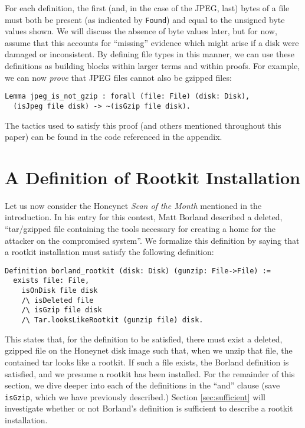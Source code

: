 \documentclass[nocopyrightspace,preprint]{sigplanconf}
\begin{document}
For each definition, the first (and, in the case of the JPEG, last) bytes of a
file must both be present (as indicated by {\tt Found}) and equal to the
unsigned byte values shown. We will discuss the absence of byte values later,
but for now, assume that this accounts for ``missing'' evidence which might
arise if a disk were damaged or inconsistent. By defining file types in this
manner, we can use these definitions as building blocks within larger terms
and within proofs. For example, we can now {\it prove} that JPEG files cannot
also be gzipped files:

\begin{lstlisting}
Lemma jpeg_is_not_gzip : forall (file: File) (disk: Disk),
  (isJpeg file disk) -> ~(isGzip file disk).
\end{lstlisting}

The tactics used to satisfy this proof (and others mentioned throughout this
paper) can be found in the code referenced in the appendix.

\section{A Definition of Rootkit Installation}

Let us now consider the Honeynet {\it Scan of the Month} mentioned in the
introduction. In his entry for this contest, Matt 
Borland\cite{borland-honeynet} described a deleted, ``tar/gzipped file
containing the tools necessary for creating a home for the attacker on the
compromised system''. We formalize this definition by saying that a rootkit
installation must satisfy the following definition:

\begin{lstlisting}
Definition borland_rootkit (disk: Disk) (gunzip: File->File) :=
  exists file: File,
    isOnDisk file disk
    /\ isDeleted file
    /\ isGzip file disk
    /\ Tar.looksLikeRootkit (gunzip file) disk.
\end{lstlisting}

This states that, for the definition to be satisfied, there must exist a
deleted, gzipped file on the Honeynet disk image such that, when we unzip that
file, the contained tar looks like a rootkit. If such a file exists, the
Borland definition is satisfied, and we presume a rootkit has been installed.
For the remainder of this section, we dive deeper into each of the definitions
in the ``and'' clause (save {\tt isGzip}, which we have previously described.)
Section \ref{sec:sufficient} will investigate whether or not Borland's
definition is sufficient to describe a rootkit installation.
\end{document}

